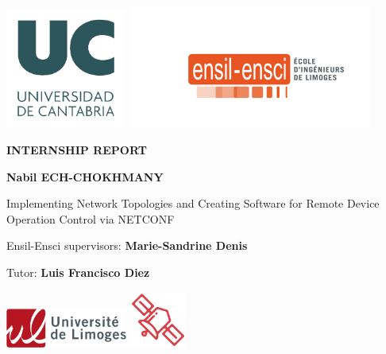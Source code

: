 \begin{titlepage}
    \begin{center}
        \includegraphics[width=0.3\textwidth]{Images/UC_logo.jpg} \hfill
        \includegraphics[width=0.6\textwidth]{Images/ENSIL2.png}
        

        \vspace*{2cm}
        
            
        \Huge
        \textbf{INTERNSHIP REPORT}
            
        \vspace{1.5cm}
        
            
        
        \large
        \textbf{Nabil ECH-CHOKHMANY}
            
        \vspace{2cm}
            
        \Huge
        Implementing Network Topologies and Creating Software for Remote Device Operation Control via NETCONF
                    
        \vspace{2cm}
            
        
            
        \Large
        Ensil-Ensci supervisors:
        \textbf{Marie-Sandrine Denis}

        \vspace{0.5cm}
        Tutor:
        \textbf{Luis Francisco Diez}

\vspace{2cm}

        \includegraphics[width=0.3\textwidth]{Images/unilim.png} \hfill
        \includegraphics[width=0.14\textwidth]{Images/ELT.png}



            
    \end{center}
\end{titlepage}